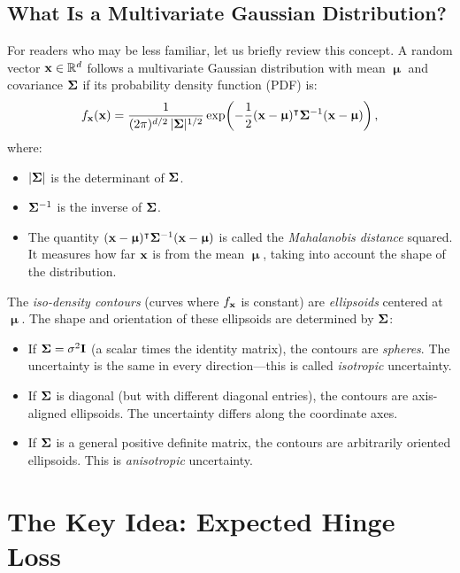 \documentclass[11pt, letterpaper]{article}
\newcommand{\bSigma}{\vb{\Sigma}}
\newcommand{\bmu}{\boldsymbol{\upmu}}
\newcommand{\R}{\mathbb{R}}
\begin{document}
\subsection{What Is a Multivariate Gaussian Distribution?}

For readers who may be less familiar, let us briefly review this concept. A random vector $\vb{x} \in \R^d$ follows a multivariate Gaussian distribution with mean $\bmu$ and covariance $\bSigma$ if its probability density function (PDF) is:
\begin{equation}\label{eq:gaussian_pdf}
    f_{\vb{x}}(\vb{x}) = \frac{1}{(2\pi)^{d/2}\, |\bSigma|^{1/2}} \exp\!\left(-\frac{1}{2}(\vb{x} - \bmu)^{\intercal} \bSigma^{-1} (\vb{x} - \bmu)\right),
\end{equation}
where:
\begin{itemize}[leftmargin=2em]
    \item $|\bSigma|$ is the determinant of $\bSigma$.
    \item $\bSigma^{-1}$ is the inverse of $\bSigma$.
    \item The quantity $(\vb{x} - \bmu)^{\intercal} \bSigma^{-1} (\vb{x} - \bmu)$ is called the \emph{Mahalanobis distance} squared. It measures how far $\vb{x}$ is from the mean $\bmu$, taking into account the shape of the distribution.
\end{itemize}
The \emph{iso-density contours} (curves where $f_{\vb{x}}$ is constant) are \emph{ellipsoids} centered at $\bmu$. The shape and orientation of these ellipsoids are determined by $\bSigma$:
\begin{itemize}[leftmargin=2em]
    \item If $\bSigma = \sigma^2 \vb{I}$ (a scalar times the identity matrix), the contours are \emph{spheres}. The uncertainty is the same in every direction---this is called \emph{isotropic} uncertainty.
    \item If $\bSigma$ is diagonal (but with different diagonal entries), the contours are axis-aligned ellipsoids. The uncertainty differs along the coordinate axes.
    \item If $\bSigma$ is a general positive definite matrix, the contours are arbitrarily oriented ellipsoids. This is \emph{anisotropic} uncertainty.
\end{itemize}

\section{The Key Idea: Expected Hinge Loss}\label{sec:expected_hinge}
\end{document}
